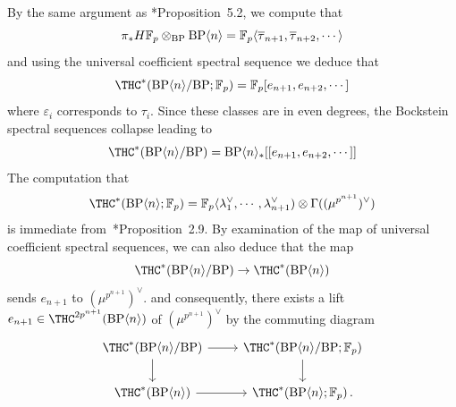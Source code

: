 By the same argument as \cite{AHL10}*{Proposition~5.2}, we compute that 
\[ \pi_*H\mathbb{F}_p\otimes_{\mathrm{BP}}\mathrm{BP}\langle n\rangle=\mathbb{F}_p\langle \overline{\tau}_{n+1},\overline{\tau}_{n+2},\cdots \rangle\]
and using the universal coefficient spectral sequence we deduce that 
\[ \THC^*(\BP\langle n\rangle/\BP ; \mathbb{F}_p)=\mathbb{F}_p[e_{n+1},e_{n+2},\cdots ]\]
where $\varepsilon_i$ corresponds to $\tau_i$. Since these classes are in even degrees, the Bockstein spectral sequences collapse leading to
\[ 
\THC^*(\BP\langle n\rangle/\BP )=\BP\langle n\rangle_*[[e_{n+1},e_{n+2},\cdots]]
\]
The computation that 
\[ 
\THC^*(\BP\langle n\rangle ; \mathbb{F}_p)=\mathbb{F}_p\langle \lambda_1^{\vee},\cdots ,\lambda_{n+1}^{\vee})\otimes \Gamma ((\mu^{p^{n+1}})^{\vee})
\]
is immediate from~\cite{ACH24}*{Proposition~2.9}. By examination of the map of universal coefficient spectral sequences, we can also deduce that the map
\[ \THC^*(\BP\langle n\rangle/\BP)\to \THC^*(\BP\langle n\rangle)\]
sends $e_{n+1}$ to $(\mu^{p^{n+1}})^{\vee}$. and consequently, there exists a lift $e_{n+1}\in \THC^{2p^{n+1}}(\BP\langle n\rangle)$ of $(\mu^{p^{n+1}})^{\vee}$ by the commuting diagram
\[
\begin{tikzcd}
\THC^*(\BP\langle n\rangle/\BP) \arrow{d} \arrow{r}& \THC^*(\BP\langle n\rangle/\BP;\mathbb{F}_p) \arrow{d}\\
\THC^*(\BP\langle n\rangle)\arrow{r} & \THC^*(\BP\langle n\rangle;\mathbb{F}_p) \,.
\end{tikzcd}
\]


